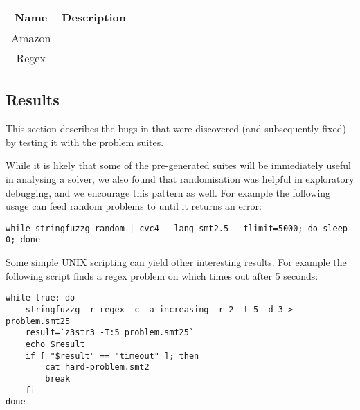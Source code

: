 
        \begin{tabular}{|c|c|}
            \hline
            \textbf{Name} & \textbf{Description} \\ \hline
            Amazon        & \\ \hline
            Regex         & \\ \hline
        \end{tabular}

\subsection{Results}

    This section describes the bugs in \us{} that were discovered (and subsequently fixed) by testing it with the \fuzzer{} problem suites.


    While it is likely that some of the pre-generated suites will be immediately useful in analysing a solver, we also found that randomisation was helpful in exploratory debugging, and we encourage this pattern as well. For example the following usage can feed random problems to \cvc{} until it returns an error:

    {\scriptsize\begin{verbatim}
while stringfuzzg random | cvc4 --lang smt2.5 --tlimit=5000; do sleep 0; done\end{verbatim}}

    Some simple UNIX scripting can yield other interesting results. For example the following script finds a regex problem on which \us{} times out after 5 seconds:

    {\scriptsize\begin{verbatim}while true; do
    stringfuzzg -r regex -c -a increasing -r 2 -t 5 -d 3 > problem.smt25
    result=`z3str3 -T:5 problem.smt25`
    echo $result
    if [ "$result" == "timeout" ]; then
        cat hard-problem.smt2
        break
    fi
done\end{verbatim}}
